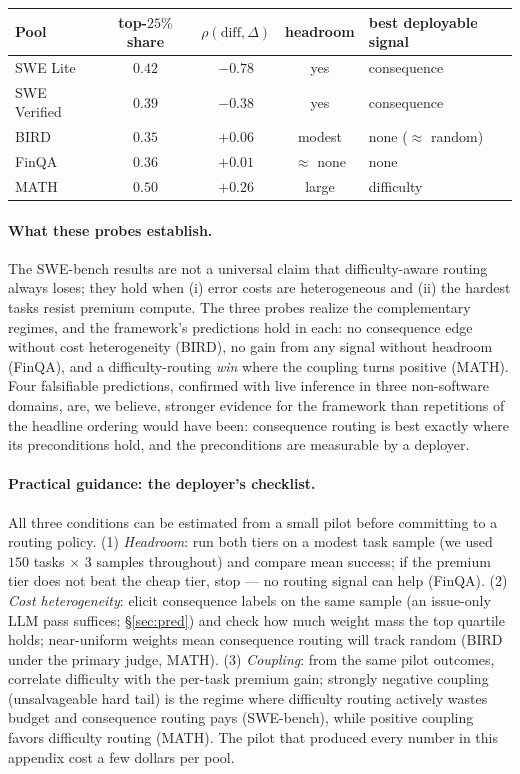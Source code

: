 \documentclass{article}
\begin{document}
\begin{center}
\small
\begin{tabular}{lcccl}
\toprule
Pool & top-$25\%$ share & $\rho(\mathrm{diff}, \Delta)$ & headroom & best deployable signal \\
\midrule
SWE Lite     & $0.42$ & $-0.78$ & yes & consequence \\
SWE Verified & $0.39$ & $-0.38$ & yes & consequence \\
BIRD         & $0.35$ & $+0.06$ & modest & none ($\approx$ random) \\
FinQA        & $0.36$ & $+0.01$ & $\approx$ none & none \\
MATH         & $0.50$ & $+0.26$ & large & difficulty \\
\bottomrule
\end{tabular}
\end{center}

\paragraph{What these probes establish.} The SWE-bench results are
not a universal claim that difficulty-aware routing always loses;
they hold when (i) error costs are heterogeneous and (ii) the
hardest tasks resist premium compute. The three probes realize the
complementary regimes, and the framework's predictions hold in each:
no consequence edge without cost heterogeneity (BIRD), no gain from
any signal without headroom (FinQA), and a difficulty-routing
\emph{win} where the coupling turns positive (MATH). Four
falsifiable predictions, confirmed with live inference in three
non-software domains, are, we believe, stronger evidence for the
framework than repetitions of the headline ordering would have been:
consequence routing is best exactly where its preconditions hold,
and the preconditions are measurable by a deployer.

\paragraph{Practical guidance: the deployer's checklist.} All three
conditions can be estimated from a small pilot before committing to a
routing policy. (1) \emph{Headroom}: run both tiers on a modest task
sample (we used $150$ tasks $\times$ $3$ samples throughout) and
compare mean success; if the premium tier does not beat the cheap
tier, stop --- no routing signal can help (FinQA). (2) \emph{Cost
heterogeneity}: elicit consequence labels on the same sample (an
issue-only LLM pass suffices; \S\ref{sec:pred}) and check how much
weight mass the top quartile holds; near-uniform weights mean
consequence routing will track random (BIRD under the primary judge,
MATH). (3) \emph{Coupling}: from the same pilot outcomes, correlate
difficulty with the per-task premium gain; strongly negative coupling
(unsalvageable hard tail) is the regime where difficulty routing
actively wastes budget and consequence routing pays (SWE-bench),
while positive coupling favors difficulty routing (MATH). The pilot
that produced every number in this appendix cost a few dollars per
pool.
\end{document}

